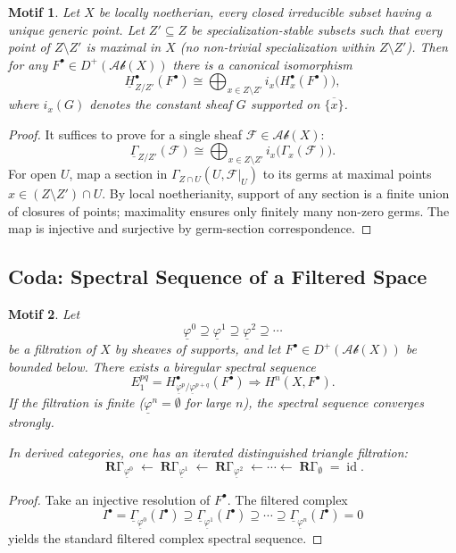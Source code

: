 \documentclass[12pt]{book}
\newcommand{\cat}[1]{\mathcal{#1}}
\newcommand{\sheaf}[1]{\mathcal{#1}}
\DeclareMathOperator{\id}{id}
\DeclareMathOperator{\RGamma}{\mathbf{R}\Gamma}
\theoremstyle{plain}
\newtheorem{motif}{Motif}[section]
\begin{document}
\setcounter{page}{226}

\begin{motif}
Let \(X\) be locally noetherian, every closed irreducible subset having a unique generic point. Let \(Z'\subseteq Z\) be specialization-stable subsets such that every point of \(Z\setminus Z'\) is \textit{maximal} in \(X\) (no non-trivial specialization within \(Z\setminus Z'\)). Then for any \(F^\bullet\in D^+(\cat{Ab}(X))\) there is a canonical isomorphism
\[
\underline{H}_{Z/Z'}^\bullet(F^\bullet)
\cong \bigoplus_{x\in Z\setminus Z'} i_x\big(H_x^\bullet(F^\bullet)\big),
\]
where \(i_x(G)\) denotes the constant sheaf \(G\) supported on \(\overline{\{x\}}\).
\end{motif}

\begin{proof}
It suffices to prove for a single sheaf \(\sheaf{F}\in\cat{Ab}(X)\):
\[
\underline{\Gamma}_{Z/Z'}(\sheaf{F})
\cong \bigoplus_{x\in Z\setminus Z'} i_x\big(\Gamma_x(\sheaf{F})\big).
\]
For open \(U\), map a section in \(\Gamma_{Z\cap U}(U,\sheaf{F}|_U)\) to its germs at maximal points \(x\in (Z\setminus Z')\cap U\). By local noetherianity, support of any section is a finite union of closures of points; maximality ensures only finitely many non-zero germs. The map is injective and surjective by germ-section correspondence.
\end{proof}

\setcounter{page}{227}

\subsection{Coda: Spectral Sequence of a Filtered Space}
\begin{motif}
Let
\[
\underline{\varphi}^0 \supseteq \underline{\varphi}^1 \supseteq \underline{\varphi}^2 \supseteq\cdots
\]
be a filtration of \(X\) by sheaves of supports, and let \(F^\bullet\in D^+(\cat{Ab}(X))\) be bounded below. There exists a biregular spectral sequence
\[
E_1^{pq}
= H_{\underline{\varphi}^p/\underline{\varphi}^{p+q}}^\bullet(F^\bullet)
\Rightarrow H^n(X,F^\bullet).
\]
If the filtration is finite (\(\underline{\varphi}^n=\emptyset\) for large \(n\)), the spectral sequence converges strongly.

In derived categories, one has an iterated distinguished triangle filtration:
\[
\RGamma_{\underline{\varphi}^0}\leftarrow
\RGamma_{\underline{\varphi}^1}\leftarrow
\RGamma_{\underline{\varphi}^2}\leftarrow\cdots\leftarrow
\RGamma_\emptyset = \id.
\]
\end{motif}

\begin{proof}
Take an injective resolution of \(F^\bullet\). The filtered complex
\[
I^\bullet = \underline{\Gamma}_{\underline{\varphi}^0}(I^\bullet)
\supseteq \underline{\Gamma}_{\underline{\varphi}^1}(I^\bullet)
\supseteq\cdots
\supseteq \underline{\Gamma}_{\underline{\varphi}^n}(I^\bullet)=0
\]
yields the standard filtered complex spectral sequence.
\end{proof}
\end{document}
